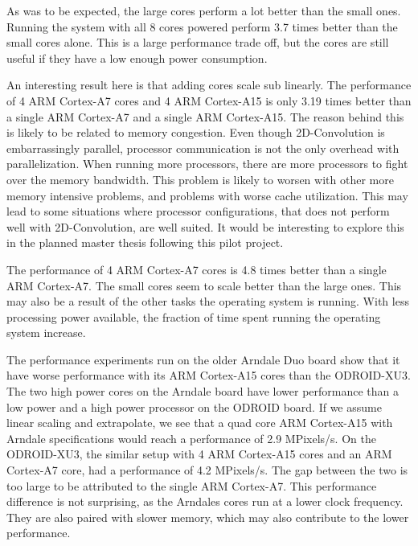 As was to be expected, the large cores perform a lot better than the small ones.
Running the system with all 8 cores powered perform 3.7 times better than the small cores alone.
This is a large performance trade off, but the cores are still useful if they have a low enough power consumption.

An interesting result here is that adding cores scale sub linearly.
The performance of 4 ARM Cortex-A7 cores and 4 ARM Cortex-A15 is only 3.19 times better than a single ARM Cortex-A7 and a single ARM Cortex-A15.
The reason behind this is likely to be related to memory congestion.
Even though 2D-Convolution is embarrassingly parallel, processor communication is not the only overhead with parallelization.
When running more processors, there are more processors to fight over the memory bandwidth.
This problem is likely to worsen with other more memory intensive problems, and problems with worse cache utilization.
This may lead to some situations where processor configurations, that does not perform well with 2D-Convolution, are well suited.
It would be interesting to explore this in the planned master thesis following this pilot project.

The performance of 4 ARM Cortex-A7 cores is 4.8 times better than a single ARM Cortex-A7.
The small cores seem to scale better than the large ones.
This may also be a result of the other tasks the operating system is running.
With less processing power available, the fraction of time spent running the operating system increase.

The performance experiments run on the older Arndale Duo board show that it have worse performance with its ARM Cortex-A15 cores than the ODROID-XU3.
The two high power cores on the Arndale board have lower performance than a low power and a high power processor on the ODROID board.
If we assume linear scaling and extrapolate, we see that a quad core ARM Cortex-A15 with Arndale specifications would reach a performance of 2.9 MPixels/s.
On the ODROID-XU3, the similar setup with 4 ARM Cortex-A15 cores and an ARM Cortex-A7 core, had a performance of 4.2 MPixels/s.
The gap between the two is too large to be attributed to the single ARM Cortex-A7.
This performance difference is not surprising, as the Arndales cores run at a lower clock frequency.
They are also paired with slower memory, which may also contribute to the lower performance.

